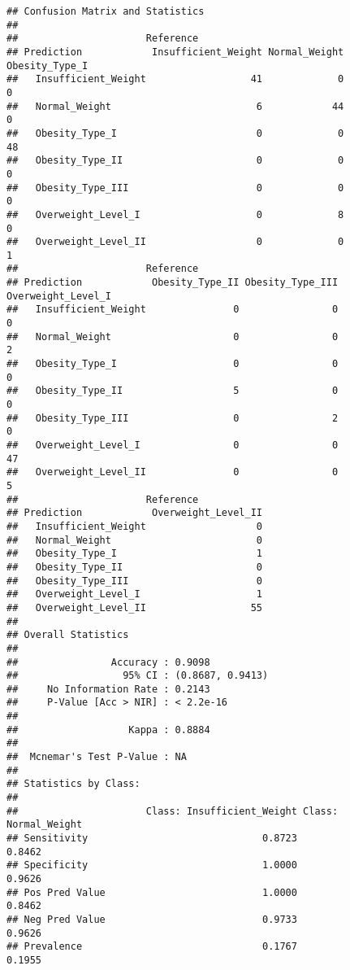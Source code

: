 \documentclass[
]{article}
\begin{document}
\begin{verbatim}
## Confusion Matrix and Statistics
## 
##                      Reference
## Prediction            Insufficient_Weight Normal_Weight Obesity_Type_I
##   Insufficient_Weight                  41             0              0
##   Normal_Weight                         6            44              0
##   Obesity_Type_I                        0             0             48
##   Obesity_Type_II                       0             0              0
##   Obesity_Type_III                      0             0              0
##   Overweight_Level_I                    0             8              0
##   Overweight_Level_II                   0             0              1
##                      Reference
## Prediction            Obesity_Type_II Obesity_Type_III Overweight_Level_I
##   Insufficient_Weight               0                0                  0
##   Normal_Weight                     0                0                  2
##   Obesity_Type_I                    0                0                  0
##   Obesity_Type_II                   5                0                  0
##   Obesity_Type_III                  0                2                  0
##   Overweight_Level_I                0                0                 47
##   Overweight_Level_II               0                0                  5
##                      Reference
## Prediction            Overweight_Level_II
##   Insufficient_Weight                   0
##   Normal_Weight                         0
##   Obesity_Type_I                        1
##   Obesity_Type_II                       0
##   Obesity_Type_III                      0
##   Overweight_Level_I                    1
##   Overweight_Level_II                  55
## 
## Overall Statistics
##                                           
##                Accuracy : 0.9098          
##                  95% CI : (0.8687, 0.9413)
##     No Information Rate : 0.2143          
##     P-Value [Acc > NIR] : < 2.2e-16       
##                                           
##                   Kappa : 0.8884          
##                                           
##  Mcnemar's Test P-Value : NA              
## 
## Statistics by Class:
## 
##                      Class: Insufficient_Weight Class: Normal_Weight
## Sensitivity                              0.8723               0.8462
## Specificity                              1.0000               0.9626
## Pos Pred Value                           1.0000               0.8462
## Neg Pred Value                           0.9733               0.9626
## Prevalence                               0.1767               0.1955

\end{verbatim}
\end{document}
